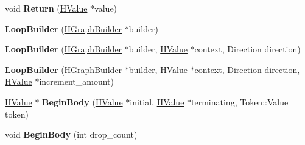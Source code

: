 \begin{DoxyCompactItemize}
\item 
\hypertarget{classv8_1_1internal_1_1_h_graph_builder_1_1_v8___f_i_n_a_l_ab2b246fea2fa15a29deed99c00be9c21}{}void {\bfseries Return} (\hyperlink{classv8_1_1internal_1_1_h_value}{H\+Value} $\ast$value)\label{classv8_1_1internal_1_1_h_graph_builder_1_1_v8___f_i_n_a_l_ab2b246fea2fa15a29deed99c00be9c21}

\item 
\hypertarget{classv8_1_1internal_1_1_h_graph_builder_1_1_v8___f_i_n_a_l_ad2af7f519b76f237e8d4d6f2ed60d104}{}{\bfseries Loop\+Builder} (\hyperlink{classv8_1_1internal_1_1_h_graph_builder}{H\+Graph\+Builder} $\ast$builder)\label{classv8_1_1internal_1_1_h_graph_builder_1_1_v8___f_i_n_a_l_ad2af7f519b76f237e8d4d6f2ed60d104}

\item 
\hypertarget{classv8_1_1internal_1_1_h_graph_builder_1_1_v8___f_i_n_a_l_a847d9732cd7a31e55d38ed37a1608045}{}{\bfseries Loop\+Builder} (\hyperlink{classv8_1_1internal_1_1_h_graph_builder}{H\+Graph\+Builder} $\ast$builder, \hyperlink{classv8_1_1internal_1_1_h_value}{H\+Value} $\ast$context, Direction direction)\label{classv8_1_1internal_1_1_h_graph_builder_1_1_v8___f_i_n_a_l_a847d9732cd7a31e55d38ed37a1608045}

\item 
\hypertarget{classv8_1_1internal_1_1_h_graph_builder_1_1_v8___f_i_n_a_l_aa1c40c6522a69b513f19738096a4392c}{}{\bfseries Loop\+Builder} (\hyperlink{classv8_1_1internal_1_1_h_graph_builder}{H\+Graph\+Builder} $\ast$builder, \hyperlink{classv8_1_1internal_1_1_h_value}{H\+Value} $\ast$context, Direction direction, \hyperlink{classv8_1_1internal_1_1_h_value}{H\+Value} $\ast$increment\+\_\+amount)\label{classv8_1_1internal_1_1_h_graph_builder_1_1_v8___f_i_n_a_l_aa1c40c6522a69b513f19738096a4392c}

\item 
\hypertarget{classv8_1_1internal_1_1_h_graph_builder_1_1_v8___f_i_n_a_l_a68ebfe76a01b31b40cde67d6fd16a126}{}\hyperlink{classv8_1_1internal_1_1_h_value}{H\+Value} $\ast$ {\bfseries Begin\+Body} (\hyperlink{classv8_1_1internal_1_1_h_value}{H\+Value} $\ast$initial, \hyperlink{classv8_1_1internal_1_1_h_value}{H\+Value} $\ast$terminating, Token\+::\+Value token)\label{classv8_1_1internal_1_1_h_graph_builder_1_1_v8___f_i_n_a_l_a68ebfe76a01b31b40cde67d6fd16a126}

\item 
\hypertarget{classv8_1_1internal_1_1_h_graph_builder_1_1_v8___f_i_n_a_l_a09fd4b51dd91f50fa2108f10361dc410}{}void {\bfseries Begin\+Body} (int drop\+\_\+count)\label{classv8_1_1internal_1_1_h_graph_builder_1_1_v8___f_i_n_a_l_a09fd4b51dd91f50fa2108f10361dc410}


\end{DoxyCompactItemize}
